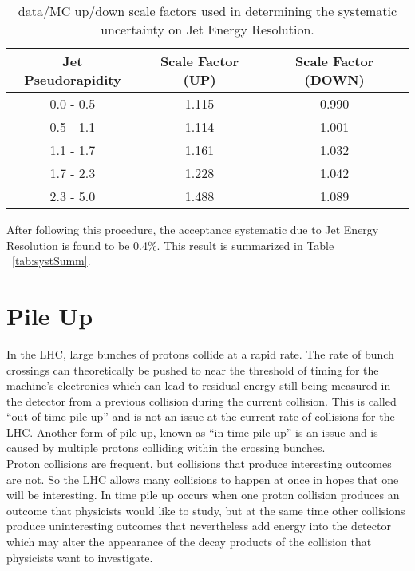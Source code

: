 \begin{table}[h]
\begin{center}

\begin{tabular}{c|c|c}\hline
Jet Pseudorapidity & Scale Factor (UP) & Scale Factor (DOWN)\\ \hline \hline
0.0 - 0.5 & 1.115 & 0.990 \\
0.5 - 1.1 & 1.114 & 1.001 \\
1.1 - 1.7 & 1.161 & 1.032 \\
1.7 - 2.3 & 1.228 & 1.042 \\
2.3 - 5.0 & 1.488 & 1.089 \\
\hline
\hline
\end{tabular}
\caption{ \label{tab:jer_scalefactor_updown} data/MC up/down scale factors used in determining the systematic uncertainty on Jet Energy Resolution.}
\end{center}
\end{table}

After following this procedure, the acceptance systematic due to Jet Energy Resolution is found to be 0.4\%. This result is summarized in Table ~\ref{tab:systSumm}.\\

\section{Pile Up}
In the LHC, large bunches of protons collide at a rapid rate. The rate of bunch crossings can theoretically be pushed to near the threshold of timing for the machine's electronics which can lead to residual energy still being measured in the detector from a previous collision during the current collision. This is called ``out of time pile up'' and is not an issue at the current rate of collisions for the LHC. Another form of pile up, known as ``in time pile up'' is an issue and is caused by multiple protons colliding within the crossing bunches.\\ 

Proton collisions are frequent, but collisions that produce interesting outcomes are not. So the LHC allows many collisions to happen at once in hopes that one will be interesting. In time pile up occurs when one proton collision produces an outcome that physicists would like to study, but at the same time other collisions produce uninteresting outcomes that nevertheless add energy into the detector which may alter the appearance of the decay products of the collision that physicists want to investigate.\\

